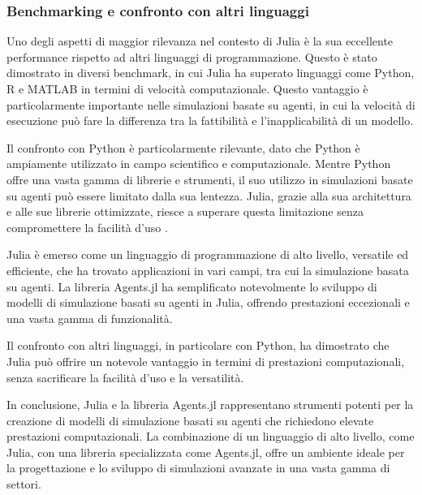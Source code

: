 \subsubsection{Benchmarking e confronto con altri linguaggi}

Uno degli aspetti di maggior rilevanza nel contesto di Julia è la sua 
eccellente performance rispetto ad altri linguaggi di programmazione. 
Questo è stato dimostrato in diversi benchmark, in cui Julia ha superato 
linguaggi come Python, R e MATLAB \cite{ABAR201713} in termini di velocità 
computazionale. Questo vantaggio è particolarmente importante nelle 
simulazioni basate su agenti, in cui la velocità di esecuzione può fare 
la differenza tra la fattibilità e l'inapplicabilità di un modello.

Il confronto con Python è particolarmente rilevante, dato che Python è 
ampiamente utilizzato in campo scientifico e computazionale. Mentre 
Python offre una vasta gamma di librerie e strumenti, il suo utilizzo 
in simulazioni basate su agenti può essere limitato dalla sua lentezza. 
Julia, grazie alla sua architettura e alle sue librerie ottimizzate, 
riesce a superare questa limitazione senza compromettere la facilità 
d'uso \cite{rackauckas2020universal} \cite{rackauckas2017differentialequations} 
\cite{Flux.jl-2018} \cite{innes:2018} \cite{pal2023lux} \cite{rackauckas2019diffeqflux}.

Julia è emerso come un linguaggio di programmazione di alto livello, 
versatile ed efficiente, che ha trovato applicazioni in vari campi, 
tra cui la simulazione basata su agenti. La libreria Agents.jl ha 
semplificato notevolmente lo sviluppo di modelli di simulazione basati 
su agenti in Julia, offrendo prestazioni eccezionali e una vasta gamma 
di funzionalità.

Il confronto con altri linguaggi, in particolare con Python, 
ha dimostrato che Julia può offrire un notevole vantaggio in termini 
di prestazioni computazionali, senza sacrificare la facilità d'uso e 
la versatilità.

In conclusione, Julia e la libreria Agents.jl rappresentano strumenti 
potenti per la creazione di modelli di simulazione basati su agenti che 
richiedono elevate prestazioni computazionali. La combinazione di un 
linguaggio di alto livello, come Julia, con una libreria specializzata 
come Agents.jl, offre un ambiente ideale per la progettazione e lo 
sviluppo di simulazioni avanzate in una vasta gamma di settori.

